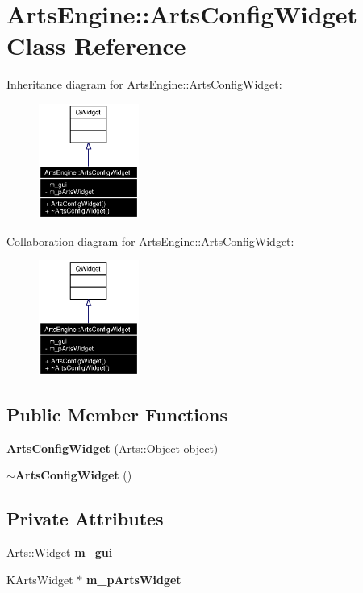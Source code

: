 \section{Arts\-Engine::Arts\-Config\-Widget Class Reference}
\label{classArtsEngine_1_1ArtsConfigWidget}
Inheritance diagram for Arts\-Engine::Arts\-Config\-Widget:\begin{figure}[H]
\begin{center}
\leavevmode
\includegraphics[width=93pt]{classArtsEngine_1_1ArtsConfigWidget__inherit__graph}
\end{center}
\end{figure}
Collaboration diagram for Arts\-Engine::Arts\-Config\-Widget:\begin{figure}[H]
\begin{center}
\leavevmode
\includegraphics[width=93pt]{classArtsEngine_1_1ArtsConfigWidget__coll__graph}
\end{center}
\end{figure}
\subsection*{Public Member Functions}
\begin{CompactItemize}
\item 
{\bf Arts\-Config\-Widget} (Arts::Object object)
\item 
{\bf $\sim$Arts\-Config\-Widget} ()
\end{CompactItemize}
\subsection*{Private Attributes}
\begin{CompactItemize}
\item 
Arts::Widget {\bf m\_\-gui}
\item 
KArts\-Widget $\ast$ {\bf m\_\-p\-Arts\-Widget}
\end{CompactItemize}



